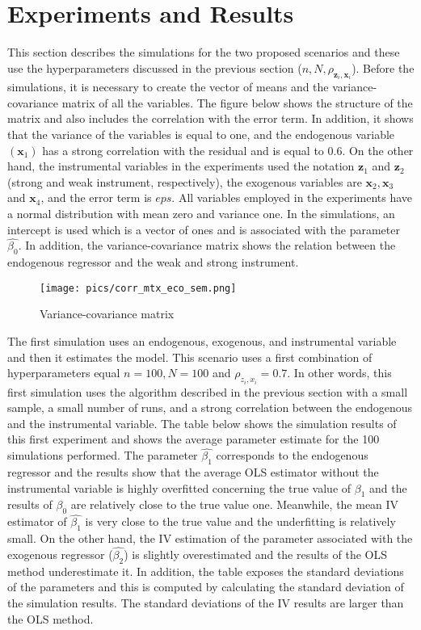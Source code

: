 \documentclass{article}
\begin{document}
\section{Experiments and Results}
This section describes the simulations for the two proposed scenarios and these use the hyperparameters discussed in the previous section ($n, N, \rho_{\textbf{z}_{i},\textbf{x}_{i}}$). Before the simulations, it is necessary to create the vector of means and the variance-covariance matrix of all the variables. The figure below shows the structure of the matrix and also includes the correlation with the error term. In addition, it shows that the variance of the variables is equal to one, and the endogenous variable $(\textbf{x}_{1})$ has a strong correlation with the residual and is equal to 0.6. 
\newline
On the other hand, the instrumental variables in the experiments used the notation $\textbf{z}_{1}$ and $\textbf{z}_{2}$ (strong and weak instrument, respectively), the exogenous variables are $\textbf{x}_{2}, \textbf{x}_{3}$ and $\textbf{x}_{4}$, and the error term is $eps$. All variables employed in the experiments have a normal distribution with mean zero and variance one. In the simulations, an intercept is used which is a vector of ones and is associated with the parameter $\hat{\beta_{0}}$. In addition, the variance-covariance matrix shows the relation between the endogenous regressor and the weak and strong instrument.
\begin{figure}[h]
\centering
\texttt{[image: pics/corr\_mtx\_eco\_sem.png]}
\caption{Variance-covariance matrix}
\label{fig:image2}
\end{figure}
\newline
The first simulation uses an endogenous, exogenous, and instrumental variable and then it estimates the model. This scenario uses a first combination of hyperparameters equal $n = 100, N = 100$ and $\rho_{z_{i},x_{i}} = 0.7$. In other words, this first simulation uses the algorithm described in the previous section with a small sample, a small number of runs, and a strong correlation between the endogenous and the instrumental variable. 
\newline
The table below shows the simulation results of this first experiment and shows the average parameter estimate for the 100 simulations performed. The parameter $\hat{\beta_{1}}$ corresponds to the endogenous regressor and the results show that the average OLS estimator without the instrumental variable is highly overfitted concerning the true value of $\beta_{1}$ and the results of $\beta_{0}$ are relatively close to the true value one. Meanwhile, the mean IV estimator of $\hat{\beta_{1}}$ is very close to the true value and the underfitting is relatively small. On the other hand, the IV estimation of the parameter associated with the exogenous regressor ($\hat{\beta_{2}}$) is slightly overestimated and the results of the OLS method underestimate it. In addition, the table exposes the standard deviations of the parameters and this is computed by calculating the standard deviation of the simulation results. The standard deviations of the IV results are larger than the OLS method.
\end{document}
